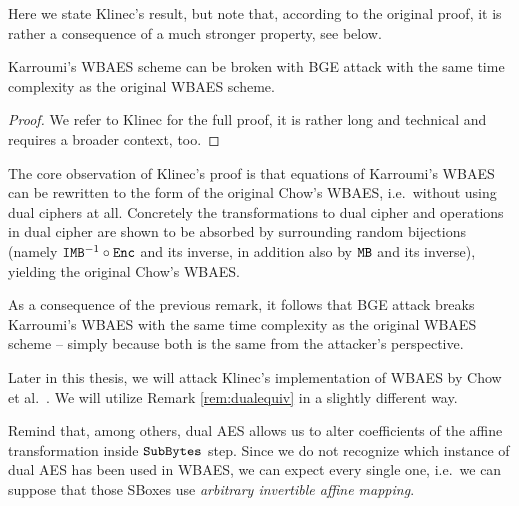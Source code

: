 	Here we state Klinec's result, but note that, according to the original proof, it is rather a consequence of a much stronger property, see below.
	
	\begin{prop}[Klinec]
	\label{thm:dualequiv}
		Karroumi's WBAES scheme can be broken with BGE attack with the same time complexity as the original WBAES scheme.
	\end{prop}
	
	\begin{proof}
		We refer to Klinec \cite{klinec2013white} for the full proof, it is rather long and technical and requires a broader context, too.
	\end{proof}
	
	\begin{remark}
	\label{rem:dualequiv}
		The core observation of Klinec's proof is that equations of Karroumi's WBAES can be rewritten to the form of the original Chow's WBAES, i.e.\ without using dual ciphers at all. Concretely the transformations to dual cipher and operations in dual cipher are shown to be absorbed by surrounding random bijections (namely $\texttt{IMB}^{-1}\circ\texttt{Enc}$ and its inverse, in addition also by $\texttt{MB}$ and its inverse), yielding the original Chow's WBAES.
	\end{remark}
	
	As a consequence of the previous remark, it follows that BGE attack breaks Karroumi's WBAES with the same time complexity as the original WBAES scheme -- simply because both is the same from the attacker's perspective.
	
	\begin{note}
	\label{note:dualsbox}
		Later in this thesis, we will attack Klinec's implementation \cite{klinec2013implementation} of WBAES by Chow et al.\ \cite{chow2002aes}. We will utilize Remark \ref{rem:dualequiv} in a slightly different way.
		
		Remind that, among others, dual AES allows us to alter coefficients of the affine transformation inside $\texttt{SubBytes}$ step. Since we do not recognize which instance of dual AES has been used in WBAES, we can expect every single one, i.e.\ we can suppose that those SBoxes use {\em arbitrary invertible affine mapping}.
	\end{note}
	

